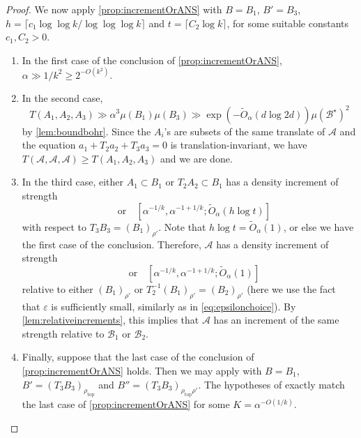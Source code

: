 \documentclass{daj}
\theoremstyle{definition}
\newcommand{\eps}{\varepsilon}
\newcommand{\A}{\ensuremath{\mathcal{A}}}
\newcommand{\B}{\ensuremath{\mathcal{B}}}
\begin{document}
\begin{proof}[Proof]
We now apply \cref{prop:incrementOrANS} with $B = B_1$, $B' = B_3$, $h = \lceil c_1 \log\log k/\log\log \log k\rceil$ and $t = \lceil C_2 \log k\rceil$, for some suitable constants $c_1, C_2 > 0$. 
\begin{enumerate}
	\item In the first case of the conclusion of \cref{prop:incrementOrANS}, $\alpha \gg 1/k^2 \geq 2^{-O(k^2)}$.
	\item In the second case, 
	\begin{equation*}
	T(A_1, A_2, A_3) \gg \alpha^3 \mu(B_1) \mu(B_3) \gg \exp\left(-\tilde{O}_{\alpha}(d\log 2d)\right) \mu(\B^{\star})^2
	\end{equation*}
	by \cref{lem:boundbohr}. Since the $A_i$'s are subsets of the same translate of $\A$ and the equation $a_1+T_2a_2+T_3a_3 = 0$ is translation-invariant, we have $T(\A, \A, \A) \geq T(A_1, A_2, A_3)$ and we are done.
	\item In the third case, either $A_1\subset B_1$ or $T_2A_2\subset B_1$ has a density increment of strength 
	\begin{equation*}
	[1, \alpha^{-1/k}; \tilde{O}_{\alpha}(h \log t)]\quad \text{or}\quad[\alpha^{-1/k}, \alpha^{-1+1/k}; \tilde{O}_{\alpha}(h \log t)]
	\end{equation*}
	with respect to $T_3B_3 = (B_1)_{\rho'}$. Note that $h \log t = \tilde{O}_{\alpha}(1)$, or else we have the first case of the conclusion. Therefore, $\A$ has a density increment of strength 
	\begin{equation*}
	[1, \alpha^{-1/k}; \tilde{O}_{\alpha}(1)]\quad \text{or}\quad[\alpha^{-1/k}, \alpha^{-1+1/k}; \tilde{O}_{\alpha}(1)]
	\end{equation*}
	relative to either $(B_1)_{\rho'}$ or $T_2^{-1}(B_1)_{\rho'} = (B_2)_{\rho'}$ (here we use the fact that $\eps$ is sufficiently small, similarly as in \cref{eq:epsilonchoice}). By \cref{lem:relativeincrements}, this implies that $\A$ has an increment of the same strength relative to $\B_1$ or $\B_2$.
	\item Finally, suppose that the last case of the conclusion of \cref{prop:incrementOrANS} holds. Then we may apply \cite[Proposition~11.8]{BS} with $B = B_1$, $B' = (T_3B_3)_{\rho_{\mathrm{top}}}$ and $B'' = (T_3B_3)_{\rho_{\mathrm{top}}\rho'}$. The hypotheses of \cite[Proposition~11.8]{BS} exactly match the last case of \cref{prop:incrementOrANS} for some $K = \alpha^{-O(1/k)}$.
	

\end{enumerate}
\end{proof}
\end{document}
